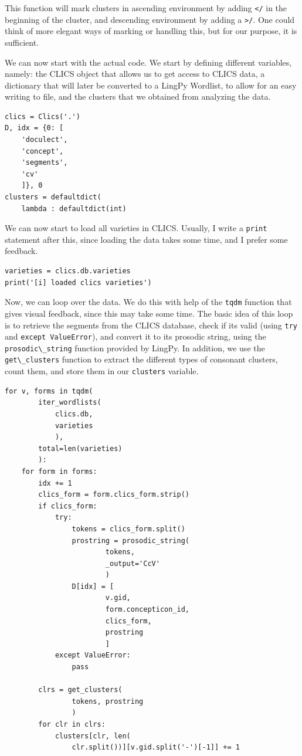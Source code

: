 \documentclass[
  english,
  a4paper,
  oneside,tablecaptionabove
]{scrbook}
\newcommand{\passthrough}[1]{#1}
\begin{document}
This function will mark clusters in ascending environment by adding
\passthrough{\lstinline!</!} in the beginning of the cluster, and
descending environment by adding a \passthrough{\lstinline!>/!}. One
could think of more elegant ways of marking or handling this, but for
our purpose, it is sufficient.

We can now start with the actual code. We start by defining different
variables, namely: the CLICS object that allows us to get access to
CLICS data, a dictionary that will later be converted to a LingPy
Wordlist, to allow for an easy writing to file, and the clusters that we
obtained from analyzing the data.

\begin{lstlisting}
clics = Clics('.') 
D, idx = {0: [ 
    'doculect', 
    'concept', 
    'segments', 
    'cv' 
    ]}, 0 
clusters = defaultdict( 
    lambda : defaultdict(int)
\end{lstlisting}

We can now start to load all varieties in CLICS. Usually, I write a
\passthrough{\lstinline!print!} statement after this, since loading the
data takes some time, and I prefer some feedback.

\begin{lstlisting}
varieties = clics.db.varieties
print('[i] loaded clics varieties')
\end{lstlisting}

Now, we can loop over the data. We do this with help of the
\passthrough{\lstinline!tqdm!} function that gives visual feedback,
since this may take some time. The basic idea of this loop is to
retrieve the segments from the CLICS database, check if its valid (using
\passthrough{\lstinline!try!} and
\passthrough{\lstinline!except ValueError!}), and convert it to its
prosodic string, using the \passthrough{\lstinline!prosodic\_string!}
function provided by LingPy. In addition, we use the
\passthrough{\lstinline!get\_clusters!} function to extract the
different types of consonant clusters, count them, and store them in our
\passthrough{\lstinline!clusters!} variable.

\begin{lstlisting}
for v, forms in tqdm(
        iter_wordlists(
            clics.db, 
            varieties
            ), 
        total=len(varieties)
        ):
    for form in forms:
        idx += 1
        clics_form = form.clics_form.strip()
        if clics_form:
            try:
                tokens = clics_form.split()
                prostring = prosodic_string(
                        tokens,
                        _output='CcV'
                        )
                D[idx] = [
                        v.gid, 
                        form.concepticon_id, 
                        clics_form,
                        prostring
                        ]
            except ValueError:
                pass

        clrs = get_clusters(
                tokens, prostring
                )
        for clr in clrs:
            clusters[clr, len(
                clr.split())][v.gid.split('-')[-1]] += 1
\end{lstlisting}
\end{document}

